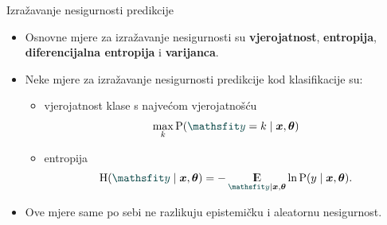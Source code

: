 \documentclass{beamer}
\begin{document}
\begin{frame}{Izražavanje nesigurnosti predikcije}
\begin{itemize}
	\item Osnovne mjere za izražavanje nesigurnosti su \textbf{vjerojatnost}, \textbf{entropija}, \textbf{diferencijalna entropija} i \textbf{varijanca}. 
	\item Neke mjere za izražavanje nesigurnosti predikcije kod klasifikacije su:
	\begin{itemize}
	 	\item vjerojatnost klase s najvećom vjerojatnošću
		\begin{align}
		\max_k \P(\rvar y=k\mid\vec x,\vec\theta)
		\end{align}
		\item entropija
		\begin{align}
		\H(\rvar y\mid\vec x,\vec\theta)=-\E_{\rvar y\mid\vec x,\vec\theta}\ln\P\del{y\mid\vec x,\vec\theta} \text{.}
		\end{align}
	\end{itemize}
	\item Ove mjere same po sebi ne razlikuju epistemičku i aleatornu nesigurnost.
\end{itemize}
\end{frame}
\end{document}
